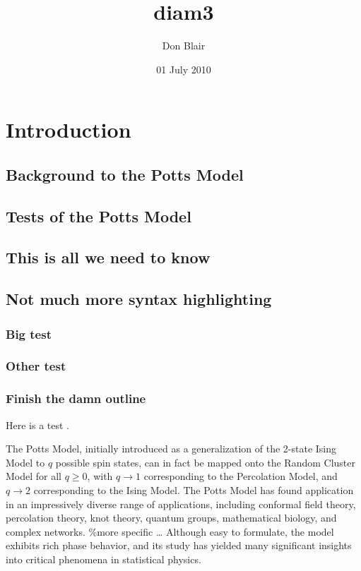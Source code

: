 \documentclass{article}
\title{diam3}
\author{Don Blair}
\date{01 July 2010}
\begin{document}
\setcounter{tocdepth}{3}
\tableofcontents
\vspace*{1cm}

\section{Introduction}
\label{sec-1}
\subsection{Background to the Potts Model}
\label{sec-1.1}
\subsection{Tests of the Potts Model}
\label{sec-1.2}
\subsection{This is all we need to know}
\label{sec-1.3}
\subsection{Not much more syntax highlighting}
\label{sec-1.4}
\subsubsection{Big test}
\label{sec-1.4.1}
\subsubsection{Other test}
\label{sec-1.4.2}
\subsubsection{Finish the damn outline}
\label{sec-1.4.3}

Here is a test \cite{OsSo04}.  


    
The Potts Model, initially introduced as a generalization of the 2-state Ising Model to $q$ possible spin states, can in fact be mapped onto the Random Cluster Model for all $q \ge 0$, with $q \to 1$ corresponding to the Percolation Model, and $q \to 2$ corresponding to the Ising Model.  The Potts Model has found application in an impressively diverse range of applications, including conformal field theory, percolation theory, knot theory, quantum groups, mathematical biology, and complex networks.    
\%more specific \ldots{}    
Although easy to formulate, the model exhibits rich phase behavior, and its study has yielded many significant insights into critical phenomena in statistical physics. 
\end{document}
